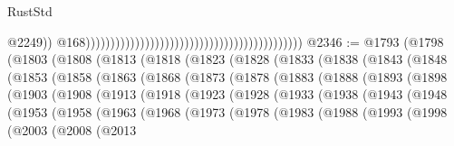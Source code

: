 \begin{lexlean}{RustStd}
\begin{coremodule}
                                                                                                @2249))
                                                                                            @168))))))))))))))))))))))))))))))))))))))))))))
@2346 := @1793
    (@1798
      (@1803
        (@1808
          (@1813
            (@1818
              (@1823
                (@1828
                  (@1833
                    (@1838
                      (@1843
                        (@1848
                          (@1853
                            (@1858
                              (@1863
                                (@1868
                                  (@1873
                                    (@1878
                                      (@1883
                                        (@1888
                                          (@1893
                                            (@1898
                                              (@1903
                                                (@1908
                                                  (@1913
                                                    (@1918
                                                      (@1923
                                                        (@1928
                                                          (@1933
                                                            (@1938
                                                              (@1943
                                                                (@1948
                                                                  (@1953
                                                                    (@1958
                                                                      (@1963
                                                                        (@1968
                                                                          (@1973
                                                                            (@1978
                                                                              (@1983
                                                                                (@1988
                                                                                  (@1993
                                                                                    (@1998
                                                                                      (@2003
                                                                                        (@2008
                                                                                          (@2013

\end{coremodule}
\end{lexlean}
